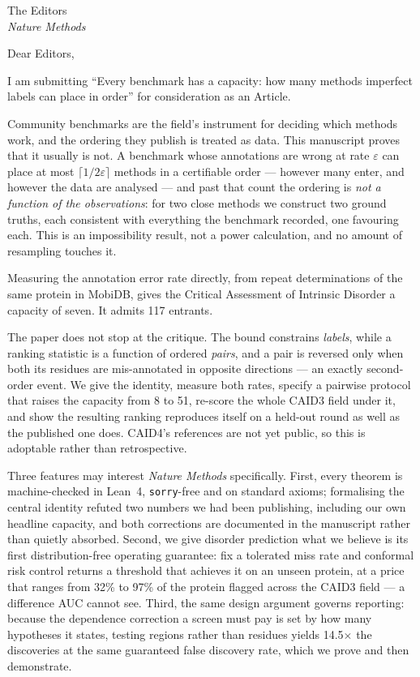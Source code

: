 \documentclass[11pt,a4paper]{letter}
\begin{document}
\begin{letter}{The Editors\\ \emph{Nature Methods}}

\opening{Dear Editors,}

I am submitting ``Every benchmark has a capacity: how many methods imperfect
labels can place in order'' for consideration as an Article.

Community benchmarks are the field's instrument for deciding which methods
work, and the ordering they publish is treated as data. This manuscript proves
that it usually is not. A benchmark whose annotations are wrong at rate
$\varepsilon$ can place at most $\lceil 1/2\varepsilon \rceil$ methods in a
certifiable order --- however many enter, and however the data are analysed ---
and past that count the ordering is \emph{not a function of the observations}:
for two close methods we construct two ground truths, each consistent with
everything the benchmark recorded, one favouring each. This is an impossibility
result, not a power calculation, and no amount of resampling touches it.

Measuring the annotation error rate directly, from repeat determinations of the
same protein in MobiDB, gives the Critical Assessment of Intrinsic Disorder a
capacity of seven. It admits 117 entrants.

The paper does not stop at the critique. The bound constrains \emph{labels},
while a ranking statistic is a function of ordered \emph{pairs}, and a pair is
reversed only when both its residues are mis-annotated in opposite directions
--- an exactly second-order event. We give the identity, measure both rates,
specify a pairwise protocol that raises the capacity from 8 to 51, re-score the
whole CAID3 field under it, and show the resulting ranking reproduces itself on
a held-out round as well as the published one does. CAID4's references are not
yet public, so this is adoptable rather than retrospective.

Three features may interest \emph{Nature Methods} specifically. First, every
theorem is machine-checked in Lean~4, \texttt{sorry}-free and on standard
axioms; formalising the central identity refuted two numbers we had been
publishing, including our own headline capacity, and both corrections are
documented in the manuscript rather than quietly absorbed. Second, we give
disorder prediction what we believe is its first distribution-free operating
guarantee: fix a tolerated miss rate and conformal risk control returns a
threshold that achieves it on an unseen protein, at a price that ranges from
32\% to 97\% of the protein flagged across the CAID3 field --- a difference AUC
cannot see. Third, the same design argument governs reporting: because the
dependence correction a screen must pay is set by how many hypotheses it states,
testing regions rather than residues yields 14.5$\times$ the discoveries at the
same guaranteed false discovery rate, which we prove and then demonstrate.


\end{letter}
\end{document}
